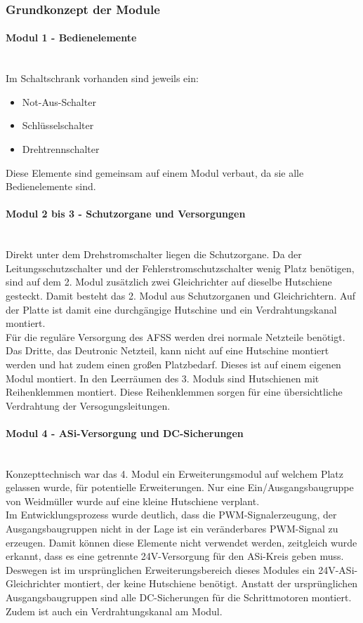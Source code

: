 \subsubsection{Grundkonzept der Module}
    \paragraph{Modul 1 - Bedienelemente}\mbox{}\\
    Im Schaltschrank vorhanden sind jeweils ein:
    \begin{itemize}
        \item Not-Aus-Schalter
        \item Schlüsselschalter
        \item Drehtrennschalter
    \end{itemize}
    Diese Elemente sind gemeinsam auf einem Modul verbaut, da sie alle Bedienelemente sind.
    \paragraph{Modul 2 bis 3 - Schutzorgane und Versorgungen}\mbox{}\\
    Direkt unter dem Drehstromschalter liegen die Schutzorgane. Da der Leitungsschutzschalter und der Fehlerstromschutzschalter wenig Platz benötigen, sind auf dem 2. Modul zusätzlich zwei Gleichrichter auf dieselbe Hutschiene gesteckt. Damit besteht das 2. Modul aus Schutzorganen und Gleichrichtern. Auf der Platte ist damit eine durchgängige Hutschine und ein Verdrahtungskanal montiert.\\
    Für die reguläre Versorgung des AFSS werden drei normale Netzteile benötigt. Das Dritte, das Deutronic Netzteil, kann nicht auf eine Hutschine montiert werden und hat zudem einen großen Platzbedarf. Dieses ist auf einem eigenen Modul montiert. In den Leerräumen des 3. Moduls sind Hutschienen mit Reihenklemmen montiert. Diese Reihenklemmen sorgen für eine übersichtliche Verdrahtung der Versogungsleitungen.
    \paragraph{Modul 4 - ASi-Versorgung und DC-Sicherungen}\mbox{}\\
    Konzepttechnisch war das 4. Modul ein Erweiterungsmodul auf welchem Platz gelassen wurde, für potentielle Erweiterungen. Nur eine Ein/Ausgangsbaugruppe von Weidmüller wurde auf eine kleine Hutschiene verplant.\\
    Im Entwicklungsprozess wurde deutlich, dass die PWM-Signalerzeugung, der Ausgangsbaugruppen nicht in der Lage ist ein veränderbares PWM-Signal zu erzeugen. Damit können diese Elemente nicht verwendet werden, zeitgleich wurde erkannt, dass es eine getrennte 24V-Versorgung für den ASi-Kreis geben muss. Deswegen ist im ursprünglichen Erweiterungsbereich dieses Modules ein 24V-ASi-Gleichrichter montiert, der keine Hutschiene benötigt. Anstatt der ursprünglichen Ausgangsbaugruppen sind alle DC-Sicherungen für die Schrittmotoren montiert. Zudem ist auch ein Verdrahtungskanal am Modul.
